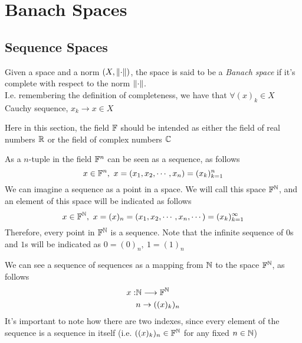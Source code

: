 \documentclass[../complete.tex]{subfiles}
\begin{document}
\section{Banach Spaces}
\subsection{Sequence Spaces}
\begin{dfn}
	Given a space and a norm $(X,\norm{\cdot})$, the space is said to be a \textit{Banach space} if it's complete with respect to the norm $\norm{\cdot}$.\\
	I.e. remembering the definition of completeness, we have that $\forall(x)_k\in X$ Cauchy sequence, $x_k\to x\in X$
\end{dfn}
\begin{ntn}
	Here in this section, the field $\mathbb{F}$ should be intended as either the field of real numbers $\mathbb{R}$ or the field of complex numbers $\mathbb{C}$
\end{ntn}
\begin{dfn}
	As a $n$-tuple in the field $\mathbb{F}^n$ can be seen as a sequence, as follows
	\begin{equation*}
		x\in\F^n,\ x=(x_1,x_2,\cdots,x_n)=(x_k)_{k=1}^n
	\end{equation*}
	We can imagine a sequence as a point in a space. We will call this space $\mathbb{F}^{\mathbb{N}}$, and an element of this space will be indicated as follows
	\begin{equation*}
		x\in\F^\N,\ x=(x)_n=(x_1,x_2,\cdots,x_n,\cdots)=(x_k)_{k=1}^\infty
	\end{equation*}
	Therefore, every point in $\mathbb{F}^{\mathbb{N}}$ is a sequence. Note that the infinite sequence of $0$s and $1$s will be indicated as $0=(0)_n,\ 1=(1)_n$
\end{dfn}
\begin{dfn}
	We can see a sequence of sequences as a mapping from $\mathbb{N}$ to the space $\mathbb{F}^{\mathbb{N}}$, as follows
	\begin{equation*}
		\begin{aligned}
			x:&\mathbb{N}\overset{}{\longrightarrow}\mathbb{F}^{\mathbb{N}}\\
			&n\to((x)_k)_n
		\end{aligned}
	\end{equation*}
	It's important to note how there are two indexes, since every element of the sequence is a sequence in itself (i.e. $((x)_k)_n\in\mathbb{F}^{\mathbb{N}}$ for any fixed $n\in\mathbb{N}$)
\end{dfn}
\end{document}
